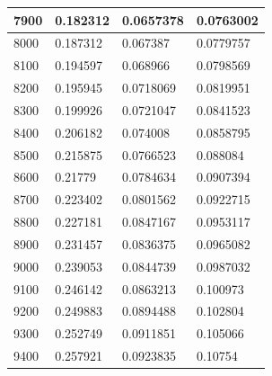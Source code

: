 \documentclass[11pt,spanish]{article} %
\begin{document}
\begin{center}
\begin{longtable}{|l||l|l|l|}
7900                    & 0.182312                     & 0.0657378                      & 0.0763002                      \\ \hline
8000                    & 0.187312                     & 0.067387                       & 0.0779757                      \\ \hline
8100                    & 0.194597                     & 0.068966                       & 0.0798569                      \\ \hline
8200                    & 0.195945                     & 0.0718069                      & 0.0819951                      \\ \hline
8300                    & 0.199926                     & 0.0721047                      & 0.0841523                      \\ \hline
8400                    & 0.206182                     & 0.074008                       & 0.0858795                      \\ \hline
8500                    & 0.215875                     & 0.0766523                      & 0.088084                       \\ \hline
8600                    & 0.21779                      & 0.0784634                      & 0.0907394                      \\ \hline
8700                    & 0.223402                     & 0.0801562                      & 0.0922715                      \\ \hline
8800                    & 0.227181                     & 0.0847167                      & 0.0953117                      \\ \hline
8900                    & 0.231457                     & 0.0836375                      & 0.0965082                      \\ \hline
9000                    & 0.239053                     & 0.0844739                      & 0.0987032                      \\ \hline
9100                    & 0.246142                     & 0.0863213                      & 0.100973                       \\ \hline
9200                    & 0.249883                     & 0.0894488                      & 0.102804                       \\ \hline
9300                    & 0.252749                     & 0.0911851                      & 0.105066                       \\ \hline
9400                    & 0.257921                     & 0.0923835                      & 0.10754                        \\ \hline

\end{longtable}
\end{center}
\end{document}
